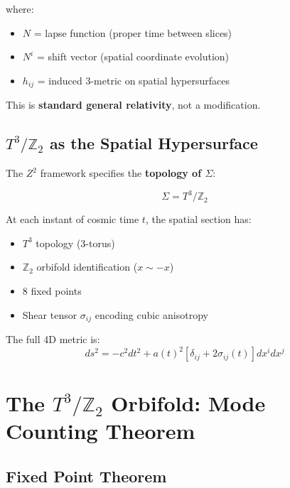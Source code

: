 \documentclass[12pt,a4paper]{article}
\newcommand{\Ztwo}{\mathbb{Z}_2}
\newcommand{\Tthree}{T^3}
\newcommand{\Zsq}{Z^2}
\begin{document}
where:
\begin{itemize}
    \item $N$ = lapse function (proper time between slices)
    \item $N^i$ = shift vector (spatial coordinate evolution)
    \item $h_{ij}$ = induced 3-metric on spatial hypersurfaces
\end{itemize}

This is \textbf{standard general relativity}, not a modification.

\subsection{$\Tthree/\Ztwo$ as the Spatial Hypersurface}

The $\Zsq$ framework specifies the \textbf{topology of $\Sigma$}:

\begin{equation}
\Sigma = \Tthree/\Ztwo
\end{equation}

At each instant of cosmic time $t$, the spatial section has:
\begin{itemize}
    \item $\Tthree$ topology (3-torus)
    \item $\Ztwo$ orbifold identification ($x \sim -x$)
    \item 8 fixed points
    \item Shear tensor $\sigma_{ij}$ encoding cubic anisotropy
\end{itemize}

The full 4D metric is:
\begin{equation}
\boxed{ds^2 = -c^2 dt^2 + a(t)^2 \left[ \delta_{ij} + 2\sigma_{ij}(t) \right] dx^i dx^j}
\end{equation}

\section{The $\Tthree/\Ztwo$ Orbifold: Mode Counting Theorem}
\label{sec:orbifold}

\subsection{Fixed Point Theorem}
\end{document}

